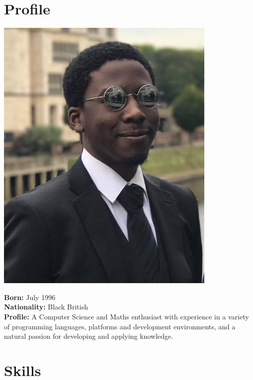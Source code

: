 \documentclass[a4paper]{cv}
\begin{document}
\begin{minipage}[t]{0.33\textwidth} %

\section{Profile}

\includegraphics[width=0.8\textwidth]{cv.jpg}

\begin{minipage}[t]{0.8\textwidth}
\textbf{Born:} \small July 1996 \\
\textbf{Nationality:} \small Black British \\
\textbf{Profile:} \small A Computer Science and Maths enthusiast with experience in a variety of programming languages, platforms and development environments, and a natural passion for developing and applying knowledge.
\end{minipage}


\section{Skills}


\end{minipage}
\end{document}
